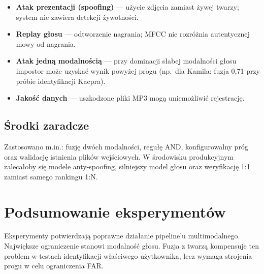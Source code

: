 \begin{itemize}
    \item \textbf{Atak prezentacji (spoofing)} --- użycie zdjęcia zamiast żywej twarzy; system nie zawiera detekcji żywotności.
    \item \textbf{Replay głosu} --- odtworzenie nagrania; MFCC nie rozróżnia autentycznej mowy od nagrania.
    \item \textbf{Atak jedną modalnością} --- przy dominacji słabej modalności głosu impostor może uzyskać wynik powyżej progu (np.\ dla Kamila: fuzja 0{,}71 przy próbie identyfikacji Kacpra).
    \item \textbf{Jakość danych} --- uszkodzone pliki MP3 mogą uniemożliwić rejestrację.
\end{itemize}

\subsection{Środki zaradcze}

Zastosowano m.in.: fuzję dwóch modalności, regułę AND, konfigurowalny próg oraz walidację istnienia plików wejściowych. W środowisku produkcyjnym zalecałoby się modele anty-spoofing, silniejszy model głosu oraz weryfikację 1:1 zamiast samego rankingu 1:N.

\section{Podsumowanie eksperymentów}

Eksperymenty potwierdzają poprawne działanie pipeline'u multimodalnego. Największe ograniczenie stanowi modalność głosu. Fuzja z twarzą kompensuje ten problem w testach identyfikacji właściwego użytkownika, lecz wymaga strojenia progu w celu ograniczenia FAR.
